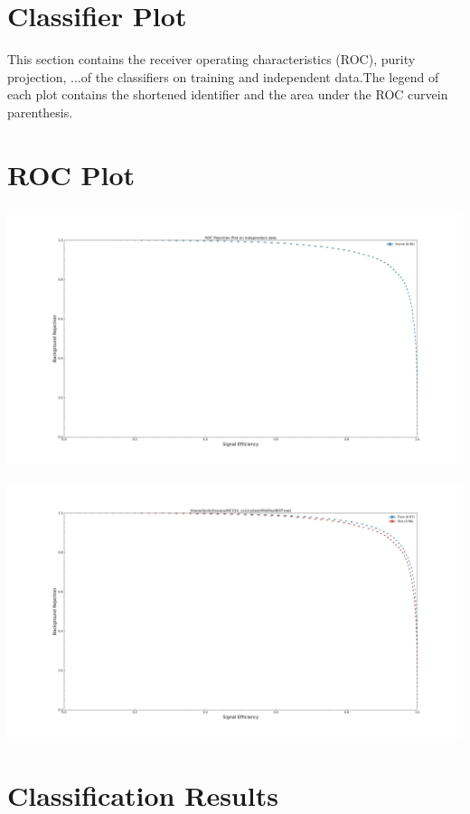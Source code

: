 \documentclass[10pt,a4paper]{article}
\begin{document}
\section{Classifier Plot}
This section contains the receiver operating characteristics (ROC), purity projection, ...of the classifiers on training and independent data.The legend of each plot contains the shortened identifier and the area under the ROC curvein parenthesis.\raggedbottom
\pagebreak[0]
\FloatBarrier
\section{ROC Plot}
\begin{center}
\includegraphics[width=1.0\textwidth]{roc_plot_test.pdf}
\end{center}
\begin{center}
\includegraphics[width=1.0\textwidth]{roc_test_-6962044671939454446.pdf}
\end{center}
\raggedbottom
\pagebreak[0]
\FloatBarrier
\section{Classification Results}
\end{document}
